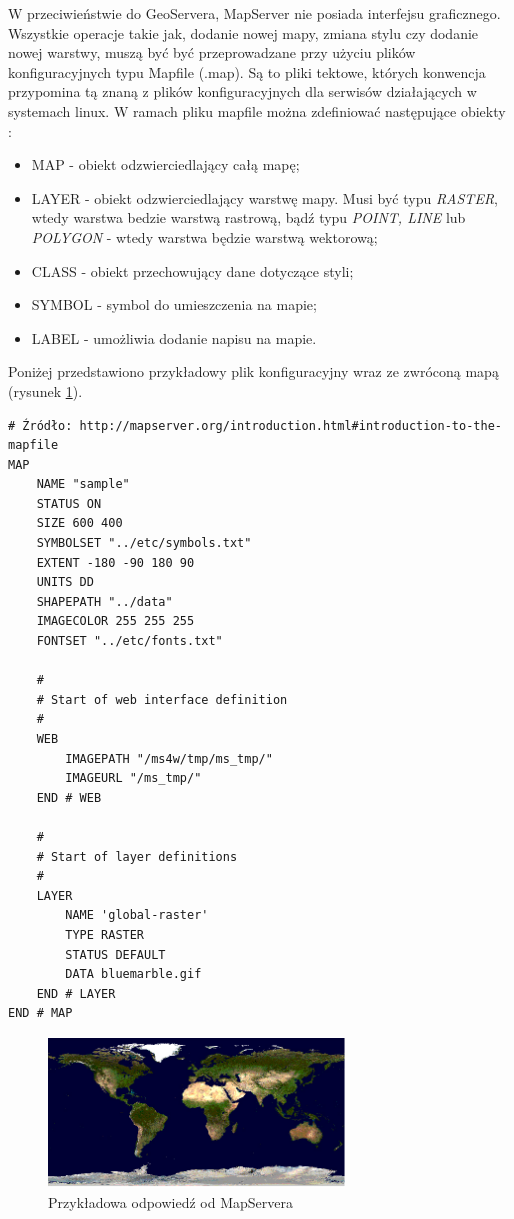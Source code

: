 W przeciwieństwie do GeoServera, MapServer nie posiada interfejsu graficznego. Wszystkie operacje takie jak,
dodanie nowej mapy, zmiana stylu czy dodanie nowej warstwy, muszą być być przeprowadzane przy użyciu plików
konfiguracyjnych typu Mapfile (.map). Są to pliki tektowe, których konwencja przypomina tą znaną z plików
konfiguracyjnych dla serwisów działających w systemach linux. W ramach pliku mapfile można zdefiniować następujące
obiekty \cite{MapServer2011}:
\begin{itemize}
    \item MAP - obiekt odzwierciedlający całą mapę;
    \item LAYER - obiekt odzwierciedlający warstwę mapy. Musi być typu \textit{RASTER}, wtedy warstwa bedzie warstwą rastrową,
        bądź typu \textit{POINT, LINE} lub \textit{POLYGON} - wtedy warstwa będzie warstwą wektorową;
    \item CLASS - obiekt przechowujący dane dotyczące styli;
    \item SYMBOL - symbol do umieszczenia na mapie;
    \item LABEL - umożliwia dodanie napisu na mapie.
\end{itemize}

Poniżej przedstawiono przykładowy plik konfiguracyjny wraz ze zwróconą mapą (rysunek \ref{fig:mapserver_config}).

\begin{lstlisting}[frame=L]
# Źródło: http://mapserver.org/introduction.html#introduction-to-the-mapfile
MAP
    NAME "sample"
    STATUS ON
    SIZE 600 400
    SYMBOLSET "../etc/symbols.txt"
    EXTENT -180 -90 180 90
    UNITS DD
    SHAPEPATH "../data"
    IMAGECOLOR 255 255 255
    FONTSET "../etc/fonts.txt"

    #
    # Start of web interface definition
    #
    WEB
        IMAGEPATH "/ms4w/tmp/ms_tmp/"
        IMAGEURL "/ms_tmp/"
    END # WEB

    #
    # Start of layer definitions
    #
    LAYER
        NAME 'global-raster'
        TYPE RASTER
        STATUS DEFAULT
        DATA bluemarble.gif
    END # LAYER
END # MAP
\end{lstlisting}

\begin{figure}[h!]
    \centering
    \includegraphics[width=0.7\textwidth]{img/mapserver_config.jpg}
    \caption{Przykładowa odpowiedź od MapServera}
    \label{fig:mapserver_config}
\end{figure}

